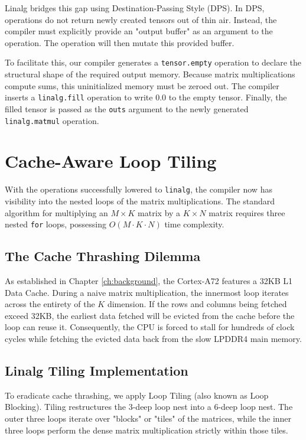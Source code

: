 Linalg bridges this gap using Destination-Passing Style (DPS). In DPS, operations do not return newly created tensors out of thin air. Instead, the compiler must explicitly provide an "output buffer" as an argument to the operation. The operation will then mutate this provided buffer.

To facilitate this, our compiler generates a \texttt{tensor.empty} operation to declare the structural shape of the required output memory. Because matrix multiplications compute sums, this uninitialized memory must be zeroed out. The compiler inserts a \texttt{linalg.fill} operation to write $0.0$ to the empty tensor. Finally, the filled tensor is passed as the \texttt{outs} argument to the newly generated \texttt{linalg.matmul} operation.

\section{Cache-Aware Loop Tiling}
With the operations successfully lowered to \texttt{linalg}, the compiler now has visibility into the nested loops of the matrix multiplications. The standard algorithm for multiplying an $M \times K$ matrix by a $K \times N$ matrix requires three nested \texttt{for} loops, possessing $O(M \cdot K \cdot N)$ time complexity.

\subsection{The Cache Thrashing Dilemma}
As established in Chapter \ref{ch:background}, the Cortex-A72 features a 32KB L1 Data Cache. During a naive matrix multiplication, the innermost loop iterates across the entirety of the $K$ dimension. If the rows and columns being fetched exceed 32KB, the earliest data fetched will be evicted from the cache before the loop can reuse it. Consequently, the CPU is forced to stall for hundreds of clock cycles while fetching the evicted data back from the slow LPDDR4 main memory.

\subsection{Linalg Tiling Implementation}
To eradicate cache thrashing, we apply Loop Tiling (also known as Loop Blocking). Tiling restructures the 3-deep loop nest into a 6-deep loop nest. The outer three loops iterate over "blocks" or "tiles" of the matrices, while the inner three loops perform the dense matrix multiplication strictly within those tiles.

